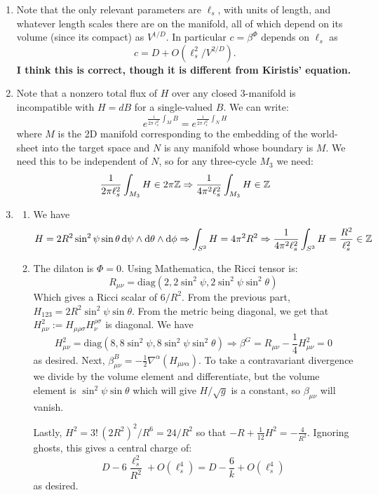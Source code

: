 \documentclass[11pt, class=article, crop=false]{standalone}
\begin{document}
\begin{enumerate}
	\item Note that the only relevant parameters are $\ell_s$, with units of length, and whatever length scales there are on the manifold, all of which depend on its volume (since its compact) as $V^{1/D}$. In particular $c = \beta^\Phi$ depends on $\ell_s$ as 
	\[
		c = D + O(\ell_s^2/V^{2/D}).
	\]
	\textbf{I think this is correct, though it is different from Kiristis' equation.}
	
	\item Note that a nonzero total flux of $H$ over any closed 3-manifold is incompatible with $H = dB$ for a single-valued $B$. We can write:
	\[
		e^{\frac{i}{2 \pi \ell_s^2} \int_{M} B } = e^{\frac{i}{2 \pi \ell_s^2} \int_{N} H }
	\]
	where $M$ is the 2D manifold corresponding to the embedding of the world-sheet into the target space and $N$ is any manifold whose boundary is $M$. We need this to be independent of $N$, so for any three-cycle $M_3$ we need:
	\[
		\frac{1}{2 \pi \ell_s^2} \int_{M_3} H \in 2 \pi \mathbb{Z} \Rightarrow \frac{1}{4\pi^2 \ell_s^2} \int_{M_3} H \in \mathbb{Z}
	\]
	\newpage
	\item 
	\begin{enumerate}
		\item We have
		\[
			H = 2 R^2 \sin^2 \psi \sin \theta \, \mathrm{d}\psi \wedge \mathrm{d} \theta \wedge \mathrm{d} \phi \Rightarrow \int_{S^3} H = 4 \pi^2 R^2 \Rightarrow \frac{1}{4 \pi^2 \ell_s^2} \int_{S^3} H = \frac{R^2}{\ell_s^2} \in \mathbb{Z}
		\]
		\item 
		The dilaton is $\Phi = 0$.  Using Mathematica, the Ricci tensor is:
		\[
			R_{\mu \nu} =  \mathrm{diag}(2, 2 \sin^2 \psi, 2 \sin^2 \psi \sin^2 \theta )
		\]
		Which gives a Ricci scalar of $6/R^2$.
		From the previous part, $H_{123} = 2 R^2 \sin^2 \psi \sin \theta$. From the metric being diagonal, we get that $H^2_{\mu \nu} := H_{\mu \rho \sigma} H_{\nu}^{\rho \sigma}$ is diagonal. We have
		\[
			H^2_{\mu \nu} = \mathrm{diag}(8, 8 \sin^2 \psi, 8 \sin^2 \psi \sin^2 \theta) \Rightarrow \beta^G = R_{\mu \nu} - \frac14 H^2_{\mu \nu} = 0
		\]
		as desired. Next, $\beta^B_{\mu \nu} = -\frac12 \nabla^\alpha (H_{\mu \nu \alpha})$. To take a contravariant divergence we divide by the volume element and differentiate, but the volume element is $\sin^2 \psi \sin \theta$ which will give $H/\sqrt g$ is a constant, so $\beta_{\mu \nu}$ will vanish. 
		
		Lastly, $H^2 = 3! \, (2 R^2)^2 / R^6 = 24 / R^2$ so that $-R + \frac{1}{12} H^2 = -\frac{4}{R^2}$. Ignoring ghosts, this gives a central charge of:
		\[
			D - 6 \frac{\ell_s^2}{R^2} + O(\ell_s^4) = D - \frac{6}{k} + O(\ell_s^4)
		\]
		as desired. 
		

\end{enumerate}
\end{enumerate}
\end{document}
